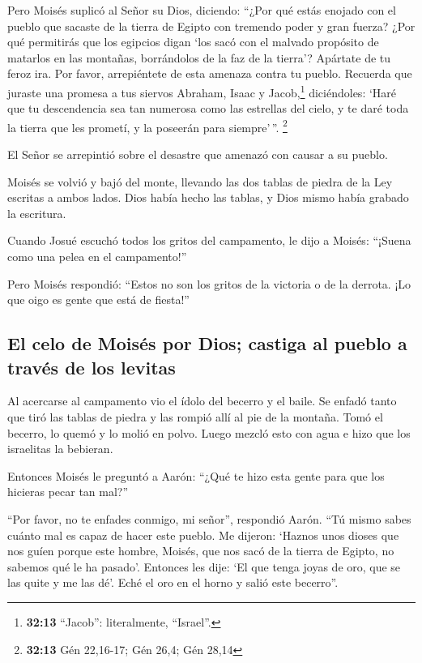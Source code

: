  Pero Moisés suplicó al Señor su Dios, diciendo: ``¿Por
qué estás enojado con el pueblo que sacaste de la tierra de Egipto con
tremendo poder y gran fuerza?  ¿Por qué permitirás que
los egipcios digan `los sacó con el malvado propósito de matarlos en las
montañas, borrándolos de la faz de la tierra'? Apártate de tu feroz ira.
Por favor, arrepiéntete de esta amenaza contra tu pueblo.
 Recuerda que juraste una promesa a tus siervos Abraham,
Isaac y Jacob,\footnote{\textbf{32:13} ``Jacob'': literalmente,
  ``Israel''.} diciéndoles: `Haré que tu descendencia sea tan numerosa
como las estrellas del cielo, y te daré toda la tierra que les prometí,
y la poseerán para siempre'\,''. \footnote{\textbf{32:13} Gén 22,16-17;
  Gén 26,4; Gén 28,14}

 El Señor se arrepintió sobre el desastre que amenazó con
causar a su pueblo.

 Moisés se volvió y bajó del monte, llevando las dos
tablas de piedra de la Ley escritas a ambos lados.  Dios
había hecho las tablas, y Dios mismo había grabado la escritura.

 Cuando Josué escuchó todos los gritos del campamento, le
dijo a Moisés: ``¡Suena como una pelea en el campamento!''

 Pero Moisés respondió: ``Estos no son los gritos de la
victoria o de la derrota. ¡Lo que oigo es gente que está de fiesta!''

\hypertarget{el-celo-de-moisuxe9s-por-dios-castiga-al-pueblo-a-travuxe9s-de-los-levitas}{%
\subsection{El celo de Moisés por Dios; castiga al pueblo a través de
los
levitas}\label{el-celo-de-moisuxe9s-por-dios-castiga-al-pueblo-a-travuxe9s-de-los-levitas}}

 Al acercarse al campamento vio el ídolo del becerro y el
baile. Se enfadó tanto que tiró las tablas de piedra y las rompió allí
al pie de la montaña.  Tomó el becerro, lo quemó y lo
molió en polvo. Luego mezcló esto con agua e hizo que los israelitas la
bebieran.

 Entonces Moisés le preguntó a Aarón: ``¿Qué te hizo esta
gente para que los hicieras pecar tan mal?''

 ``Por favor, no te enfades conmigo, mi señor'',
respondió Aarón. ``Tú mismo sabes cuánto mal es capaz de hacer este
pueblo.  Me dijeron: `Haznos unos dioses que nos guíen
porque este hombre, Moisés, que nos sacó de la tierra de Egipto, no
sabemos qué le ha pasado'.  Entonces les dije: `El que
tenga joyas de oro, que se las quite y me las dé'. Eché el oro en el
horno y salió este becerro''.

